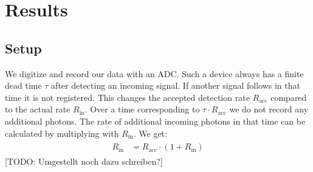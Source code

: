 \section{Results}
%
\subsection{Setup}
%
We digitize and record our data with an ADC.
Such a device always has a finite dead time $\tau$ after detecting an incoming signal.
If another signal follows in that time it is not registered.
This changes the accepted detection rate $R_{\text{acc}}$ compared to the actual rate $R_{\text{in}}$.
Over a time corresponding to $\tau \cdot R_{\text{acc}}$ we do not record any additional photons.
The rate of additional incoming photons in that time can be calculated by multiplying with $R_{\text{in}}$.
We get:
\begin{align}
    \label{eq:}
    \begin{split}
        R_{\text{in}} &= R_{\text{acc}} \cdot (1 + R_{\text{in}} )
    \end{split}
\end{align}
[TODO: Umgestellt noch dazu schreiben?]
%
